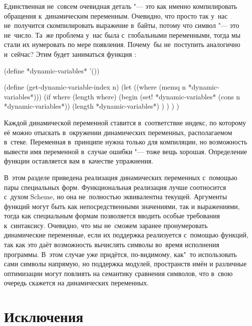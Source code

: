 Единственная не~совсем очевидная деталь "--- это как именно компилировать
обращения к~динамическим переменным. Очевидно, что просто так у~нас не~получится
скомпилировать выражение  в~байты, потому что символ 
"--- это не~число. Та~же проблема у~нас была с~глобальными переменными, тогда мы
стали их нумеровать по мере появления. Почему~бы не~поступить аналогично
и~сейчас? Этим будет заниматься функция :

\begin{code:lisp}
(define *dynamic-variables* '())

(define (get-dynamic-variable-index n)
  (let ((where (memq n *dynamic-variables*)))
    (if where (length where)
        (begin
          (set! *dynamic-variables* (cons n *dynamic-variables*))
          (length *dynamic-variables*) ) ) ) )
\end{code:lisp}

Каждой динамической переменной ставится в~соответствие индекс, по которому её
можно отыскать в~окружении динамических переменных, располагаемом в~стеке.
Переменная  в~принципе нужна только для компиляции, но
возможность вывести имя переменной в~случае ошибки "--- тоже вещь хорошая.
Определение функции  оставляется вам в~качестве
упражнения.

В~этом разделе приведена реализация динамических переменных с~помощью пары
специальных форм. Функциональная реализация лучше соотносится с~духом Scheme,
но она не~полностью эквивалентна текущей. Аргументы функций могут быть как
непосредственными значениями, так и выражениями, тогда как специальным формам
позволяется вводить особые требования к~синтаксису. Очевидно, что мы не~сможем
заранее пронумеровать динамические переменные, если их поддержка реализуется
с~помощью функций, так как это даёт возможность вычислять символы во~время
исполнения программы.
 В~этом случае уже
придётся, по-видимому, как"~то использовать сами символы напрямую, но поддержка
модулей, пространств имён и различные оптимизации могут повлиять на семантику
сравнения символов, что в~свою очередь скажется на динамических переменных.


\section{Исключения}\label{compilation/sect:exception}

